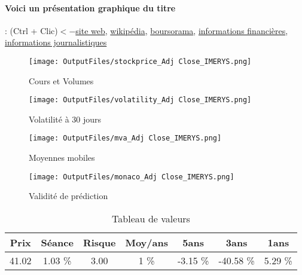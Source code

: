 \documentclass[11pt,a4paper]{report}%
\begin{document}
\paragraph{Voici un présentation graphique du titre} : (Ctrl + Clic)$<-$\href{https://www.imerys.com/fr/finance}{site web}, \href{https://fr.wikipedia.org/wiki/Imerys}{wikipédia}, \href{https://www.boursorama.com/cours/1rPNK}{boursorama}, \href{https://www.qwant.com/?q=site:https:%2f%2fwww.easybourse.com%2faction-societe%2fIMERYS&t=web&client=ext-firefox-hp}{informations financières}, \href{https://bourse.lerevenu.com/cours-de-bourse/fiche-valeur-synthese/IMERYS/NK-FR}{informations journalistiques}
\begin{figure}[!htb]
   \begin{minipage}{0.5\textwidth}
     \centering
     \texttt{[image: OutputFiles/stockprice\_Adj Close\_IMERYS.png]}
     \caption{Cours et Volumes}\label{Fig:price_IMERYS}
   \end{minipage}\hfill
   \begin{minipage}{0.5\textwidth}
     \centering
     \texttt{[image: OutputFiles/volatility\_Adj Close\_IMERYS.png]}
     \caption{Volatilité à 30 jours}\label{Fig:volat_IMERYS}
   \end{minipage}
\end{figure}
\begin{figure}[!htb]
   \begin{minipage}{0.5\textwidth}
     \centering
     \texttt{[image: OutputFiles/mva\_Adj Close\_IMERYS.png]}
     \caption{Moyennes mobiles}\label{Fig:mva_IMERYS}
   \end{minipage}\hfill
   \begin{minipage}{0.5\textwidth}
     \centering
     \texttt{[image: OutputFiles/monaco\_Adj Close\_IMERYS.png]}
     \caption{Validité de prédiction}\label{Fig:prediction_IMERYS}
   \end{minipage}
\end{figure}

\begin{table}[H]
  \centering
    \begin{tabular}{|c|c|c|c|c|c|c|}
    \hline
    Prix & Séance & Risque  & Moy/ans & 5ans & 3ans & 1ans \\
    \hline
    41.02 &    1.03 \%    & 3.00 & 1 \% & -3.15 \% & -40.58 \% & 5.29 \% \\
    \hline
    \end{tabular}%
        \label{tab:table_IMERYS}%
      \caption{Tableau de valeurs}
\end{table}%
\end{document}
